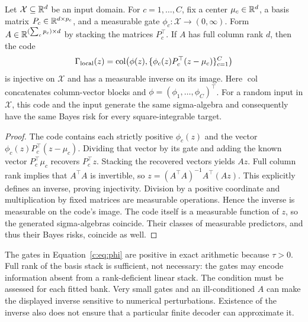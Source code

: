 \begin{proposition}
\label{c:prop:local-injectivity}
Let $\mathcal X\subseteq\mathbb{R}^d$ be an input domain. For
$c=1,\ldots,C$, fix a center $\mu_c\in\mathbb{R}^d$, a basis matrix
$P_c\in\mathbb{R}^{d\times p_c}$, and a measurable gate
$\phi_c:\mathcal X\to(0,\infty)$. Form
$A\in\mathbb{R}^{(\sum_c p_c)\times d}$ by stacking the matrices $P_c^\top$.
If $A$ has full column rank $d$, then the code
\[
 \Gamma_{\rm local}(z)=\operatorname{col}\!\left(
 \phi(z),\{\phi_c(z)P_c^\top(z-\mu_c)\}_{c=1}^{C}\right)
\]
is injective on $\mathcal X$ and has a measurable inverse on its image.
Here $\operatorname{col}$ concatenates column-vector blocks and
$\phi=(\phi_1,\ldots,\phi_C)^\top$. For a random input in
$\mathcal X$, this code and the input generate the same sigma-algebra
and consequently have the same Bayes risk for every square-integrable
target.
\end{proposition}
\begin{proof}
The code contains each strictly positive $\phi_c(z)$ and the vector
$\phi_c(z)P_c^\top(z-\mu_c)$. Dividing that vector by its gate and
adding the known vector $P_c^\top\mu_c$ recovers $P_c^\top z$.
Stacking the recovered vectors yields $Az$. Full column rank implies
that $A^\top A$ is invertible, so
$z=(A^\top A)^{-1}A^\top(Az)$. This explicitly defines an inverse,
proving injectivity. Division by a positive coordinate and multiplication
by fixed matrices are measurable operations. Hence the inverse is
measurable on the code's image. The code itself is a measurable function
of $z$, so the generated sigma-algebras coincide. Their classes of
measurable predictors, and thus their Bayes risks, coincide as well.
\end{proof}

The gates in Equation~\eqref{c:eq:phi} are positive in exact arithmetic
because $\tau>0$. Full rank of the basis stack is sufficient, not
necessary: the gates may encode information absent from a rank-deficient
linear stack. The condition must be assessed for each fitted bank.
Very small gates and an ill-conditioned $A$ can make the displayed
inverse sensitive to numerical perturbations. Existence of the inverse
also does not ensure that a particular finite decoder can approximate it.

